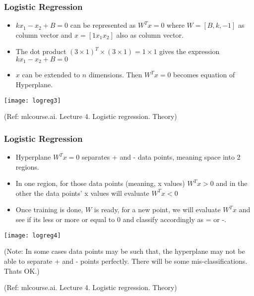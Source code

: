 \begin{frame}[fragile]\frametitle{Logistic Regression}
\begin{itemize}
\item $kx_1 -x_2 + B =0$ can be represented as $W^Tx = 0$ where $W = [B, k, -1]$ as column vector and $x =  [1 x_1 x_2]$ also as column vector.
\item The dot product $(3 \times 1)^T \times (3 \times 1) = 1 \times 1$ gives the expression $kx_1 -x_2 + B =0$

\item $x$ can be extended to $n$ dimensions. Then $W^Tx = 0$ becomes equation of Hyperplane.
\end{itemize}

\begin{center}
\texttt{[image: logreg3]}
\end{center}

{\tiny (Ref: mlcourse.ai. Lecture 4. Logistic regression. Theory)}

\end{frame}

\begin{frame}[fragile]\frametitle{Logistic Regression}
\begin{itemize}
\item Hyperplane $W^Tx = 0$ separates + and - data points, meaning space into 2 regions.
\item In one region, for those data points (meaning, x values) $W^Tx > 0$ and in the other the data points' x values will evaluate $W^Tx < 0$
\item Once training is done, $W$ is ready, for a new point, we will evaluate $W^Tx$ and see if its less or more or equal to 0 and classify accordingly as = or -.
\end{itemize}

\begin{center}
\texttt{[image: logreg4]}
\end{center}

(Note: In some cases data points may be such that, the hyperplane may not be able to separate + and - points perfectly. There will be some mis-classifications. Thats OK.)

{\tiny (Ref: mlcourse.ai. Lecture 4. Logistic regression. Theory)}

\end{frame}

